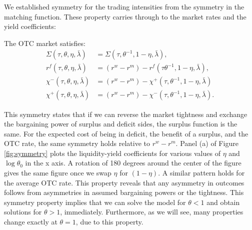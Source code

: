 \documentclass[12pt,american,english,notitlepage]{article}
\begin{document}
We established symmetry for the trading intensities from the symmetry
in the matching function. These property carries through to the market
rates and the yield coefficients: 
\begin{proposition}[Symmetry]\label{prop:symmetry} The OTC market
satisfies:
\begin{align}
\Sigma\left(\tau,\theta,\eta,\bar{\lambda}\right)&=\Sigma\left(\tau,\theta^{-1},1-\eta,\bar{\lambda}\right),\\ r^{f}\left(\tau,\theta,\eta,\bar{\lambda}\right)&=\left(r^{w}-r^{m}\right)-r^{f}\left(\tau\theta^{-1},1-\eta,\bar{\lambda}\right), \\
\chi^{-}\left(\tau,\theta,\eta,\bar{\lambda}\right)& =\left(r^{w}-r^{m}\right)-\chi^{+}\left(\tau,\theta^{-1},1-\eta,\bar{\lambda}\right)\\
\chi^{+}\left(\tau,\theta,\eta,\bar{\lambda}\right)&=\left(r^{w}-r^{m}\right)-\chi^{-}\left(\tau,\theta^{-1},1-\eta,\bar{\lambda}\right).
\end{align}

\end{proposition}
This symmetry states that if we can reverse the market tightness and
exchange the bargaining power of surplus and deficit sides, the
surplus function is the same. For the expected cost of being in deficit,
the benefit of a surplus, and the OTC rate, the same symmetry holds
relative to $r^{w}-r^{m}$. Panel (a) of Figure \ref{fig:symmetry}
plots the liquidity-yield coefficients for various values of $\eta$
and $\log\theta_{0}$ in the x axis. A rotation of 180 degrees around
the center of the figure gives the same figure once we swap $\eta$
for $\left(1-\eta\right)$. A similar pattern holds for the average
OTC rate. This property reveals that any asymmetry in outcomes
follows from asymmetries in assumed bargaining powers or the tightness.
This symmetry property implies that we can solve the model for $\theta<1$
and obtain solutions for $\theta>1$, immediately. Furthermore, as
we will see, many properties change exactly at $\theta=1$, due to
this property.
\end{document}
